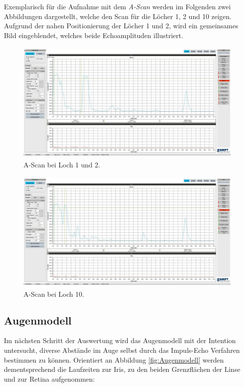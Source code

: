 \noindent Exemplarisch für die Aufnahme mit dem \emph{A-Scan} werden im Folgenden zwei Abbildungen dargestellt, welche den Scan 
für die Löcher 1, 2 und 10 zeigen. Aufgrund der nahen Positionierung der Löcher 1 und 2, wird ein gemeinsames Bild eingeblendet, 
welches beide Echoamplituden illustriert.

\begin{figure}[H]
    \centering
    \includegraphics[height=6cm]{US2_Loch_1_2_top.jpg}
    \caption{A-Scan bei Loch 1 und 2.}
    \label{fig:Loch12}
\end{figure}

\begin{figure}[H]
    \centering 
    \includegraphics[height=6cm]{US2_Loch_10_top.jpg}
    \caption{A-Scan bei Loch 10.}
    \label{fig:Loch10}
\end{figure}

\subsection{Augenmodell}

\noindent Im nächsten Schritt der Auswertung wird das Augenmodell mit der Intention untersucht, diverse Abstände im Auge selbst durch 
das Impuls-Echo Verfahren bestimmen zu können. Orientiert an Abbildung \ref{fig:Augenmodell} werden dementsprechend die Laufzeiten zur Iris, 
zu den beiden Grenzflächen der Linse und zur Retina aufgenommen:

